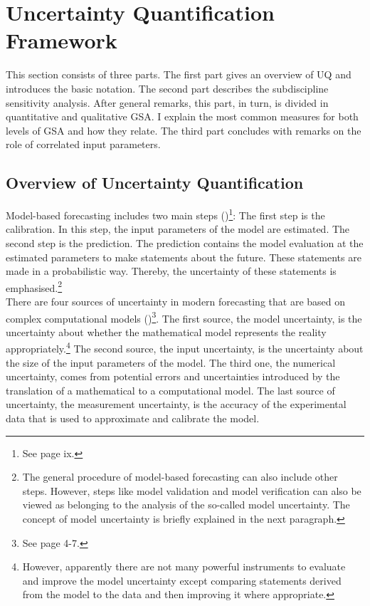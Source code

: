 \documentclass[a4paper,12pt]{article}
\begin{document}
\newpage %

\section{Uncertainty Quantification Framework}
\thispagestyle{plain} %

This section consists of three parts. The first part gives an overview of UQ and introduces the basic notation. The second part describes the subdiscipline sensitivity analysis. After general remarks, this part, in turn, is divided in quantitative and qualitative GSA. I explain the most common measures for both levels of GSA and how they relate. The third part concludes with remarks on the role of correlated input parameters.

\subsection{Overview of Uncertainty Quantification}
Model-based forecasting includes two main steps (\cite{Smith.2014})\footnote{See page ix.}: The first step is the calibration. In this step, the input parameters of the model are estimated. The second step is the prediction. The prediction contains the model evaluation at the estimated parameters to make statements about the future. These statements are made in a probabilistic way. Thereby, the uncertainty of these statements is emphasised.\footnote{The general procedure of model-based forecasting can also include other steps. However, steps like model validation and model verification can also be viewed as belonging to the analysis of the so-called model uncertainty. The concept of model uncertainty is briefly explained in the next paragraph.}\\
\newline
There are four sources of uncertainty in modern forecasting that are based on complex computational models (\cite{Smith.2014})\footnote{See page 4-7.}. The first source, the model uncertainty, is the uncertainty about whether the mathematical model represents the reality appropriately.\footnote{However, apparently there are not many powerful instruments to evaluate and improve the model uncertainty except comparing statements derived from the model to the data and then improving it where appropriate.} The second source, the input uncertainty, is the uncertainty about the size of the input parameters of the model. The third one, the numerical uncertainty, comes from potential errors and uncertainties introduced by the translation of a mathematical to a computational model. The last source of uncertainty, the measurement uncertainty, is the accuracy of the experimental data that is used to approximate and calibrate the model.
\end{document}
